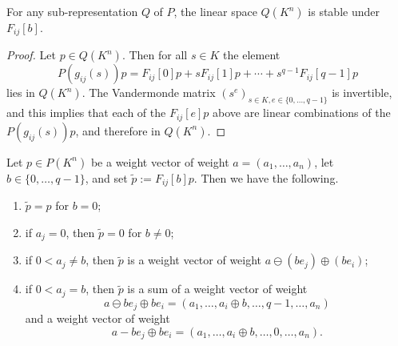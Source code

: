 \documentclass{amsart}
\newcommand{\omin}{\ominus}
\begin{document}
\begin{lm}
For any sub-representation $Q$ of $P$, the linear space $Q(K^n)$ is
stable under $F_{ij}[b]$. 
\end{lm}

\begin{proof}
Let $p \in Q(K^n)$. Then for all $s \in K$ the element
\[ P(g_{ij}(s))p=F_{ij}[0]p + s F_{ij}[1]p + \cdots +
s^{q-1} F_{ij}[q-1]p \]
lies in $Q(K^n)$. The Vandermonde matrix $(s^e)_{s \in K, e \in
\{0,\ldots,q-1\}}$ is invertible, and this implies that each of the
$F_{ij}[e]p$ above are linear combinations of the
$P(g_{ij}(s))p$, and therefore in $Q(K^n)$.
\end{proof}

\begin{lm} \label{lm:OneParameter}
Let $p \in P(K^n)$ be a weight vector of weight $a=(a_1,\ldots,a_n)$,
let $b \in \{0,\ldots,q-1\}$, and set $\tilde{p}:=F_{ij}[b]p$. 
Then we have the following.
\begin{enumerate}
\item $\tilde{p}=p$ for $b=0$;
\item if $a_j=0$, then $\tilde{p}=0$ for $b \neq 0$;
\item if $0<a_j \neq b$, then $\tilde{p}$ is a weight vector of
weight $a \omin (b e_j) \oplus (b e_i)$;
\item if $0<a_j = b$, then $\tilde{p}$ is a sum of a weight
vector of weight 
\[ a \omin b e_j \oplus b e_i 
= (a_1,\ldots,a_i \oplus b,\ldots,q-1,\ldots,a_n) \]
and a weight vector of weight 
\[ a - b e_j \oplus b e_i 
= (a_1,\ldots,a_i \oplus b,\ldots,0,\ldots,a_n). \]
\end{enumerate}
\end{lm}
\end{document}
